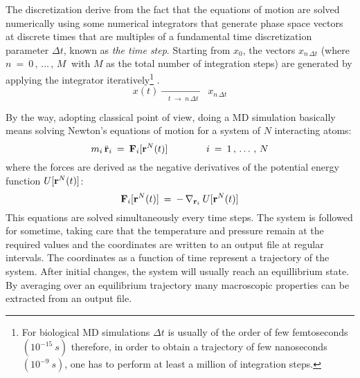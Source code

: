 The discretization derive from the fact that the equations of motion are solved numerically using some numerical integrators that generate phase space vectors at discrete times that are multiples of a fundamental time discretization parameter $\Delta t$, known as \textit{the time step}.
Starting from $x_0$, the vectors $x_{n \, \Delta t}$ (where $n \:=\: 0 \, , \, \dots \, , \, M\:$ with $M$ as the total number of integration steps) are generated by applying the integrator iteratively\footnote{For biological MD simulations $\Delta t$ is usually of the order of few femtoseconds $(10^{-15} \: s)$ therefore, in order to obtain a trajectory of few nanoseconds $(10^{-9} \: s)$, one has to perform at least a million of integration steps.} \cite{ref:mypresentation}.
\begin{equation}\label{eq:discretization}
x(t) \xrightarrow[\quad t \;\rightarrow\; n\,\Delta t \quad]{} x_{n \, \Delta t}
\end{equation}

By the way, adopting classical point of view, doing a MD simulation basically means solving Newton's equations of motion for a system of $N$ interacting atoms: 
\begin{equation}\label{eq:newtons2law}
m_i \, \ddot{\bold{r}}_i \: = \: \bold{F}_i [\bold{r}^N(t)]
\qquad\qquad i \:=\: 1 \, , \, \dots \, , \, N
\end{equation}
where the forces are derived as the negative derivatives of the potential energy function $U [\bold{r}^N(t)]$:
\begin{equation}\label{eq:force-enpot}
\bold{F}_i [\bold{r}^N(t)] \:=\: - \, \nabla_{\bold{r}_i} \: U [\bold{r}^N(t)] 
\end{equation}
This equations are solved simultaneously every time steps. The system is followed for sometime, taking care that the temperature and pressure remain at the required values and the coordinates are written to an output file at regular intervals. The coordinates as a function of time represent a trajectory of the system. After initial changes, the system will usually reach an equillibrium state. By averaging over an equilibrium trajectory many macroscopic properties can be extracted from an output file.

